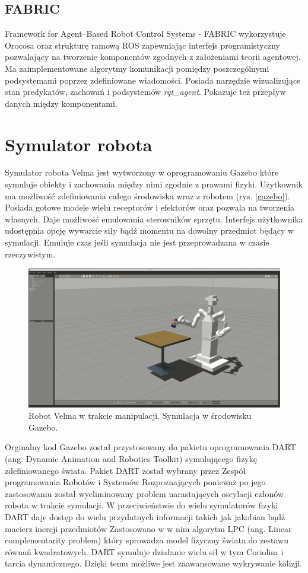 	\subsection{FABRIC}
	Framework for Agent–Based Robot Control Systems - FABRIC\cite{bib:fabric} wykorzystuje Orocosa oraz strukturę ramową ROS zapewniając interfejs programistyczny pozwalający na tworzenie komponentów zgodnych z założeniami teorii agentowej. Ma zaimplementowane algorytmy komunikacji pomiędzy poszczególnymi podsystemami poprzez zdefiniowane wiadomości. Posiada narzędzie wizualizujące stan predykatów, zachowań i podsystemów \textit{rqt\_agent}\cite{bib:rqtAgent}. Pokazuje też przepływ danych między komponentami.

	
	\section{Symulator robota}
	Symulator robota Velma jest wytworzony w oprogramowaniu Gazebo \cite{bib:Gazebo} które symuluje obiekty i zachowania między nimi zgodnie z prawami fizyki. Użytkownik ma możliwość zdefiniowania całego środowiska wraz z robotem (rys. \ref{gazebo}). Posiada gotowe modele wielu receptorów i efektorów oraz pozwala na tworzenia własnych. Daje możliwość emulowania sterowników sprzętu. Interfejs użytkownika udostępnia opcję wywarcie siły bądź momentu na dowolny przedmiot będący w symulacji. Emuluje czas jeśli symulacja nie jest przeprowadzana w czasie rzeczywistym.
	
	\begin{figure}
		\centering
		\includegraphics[width=.6\textwidth]{images/gazebo.png}
		\caption{Robot Velma w trakcie manipulacji. Symulacja w środowisku Gazebo.}
		\label{fig:gazebo}
	\end{figure}

	Orginalny kod Gazebo został przystosowany do pakietu oprogramowania DART (ang. Dynamic Animation and Robotics Toolkit) \cite{bib:dart} symulującego fizykę zdefiniowanego świata. Pakiet DART został wybrany przez Zespół programowania Robotów i Systemów Rozpoznających ponieważ po jego zastosowaniu został wyeliminowany problem narastających oscylacji członów robota w trakcie symulacji. W przeciwieństwie do wielu symulatorów fizyki DART daje dostęp do wielu przydatnych informacji takich jak jakobian bądź macierz inercji przedmiotów Zastosowano w w nim algorytm LPC (ang. Linear complementarity problem) \cite{bib:lpcBase} który sprowadza model fizyczny świata do zestawu równań kwadratowych. DART symuluje działanie wielu sił w tym Coriolisa i tarcia dynamicznego. Dzięki temu możliwe jest zaawansowane wykrywanie kolizji. 
	

